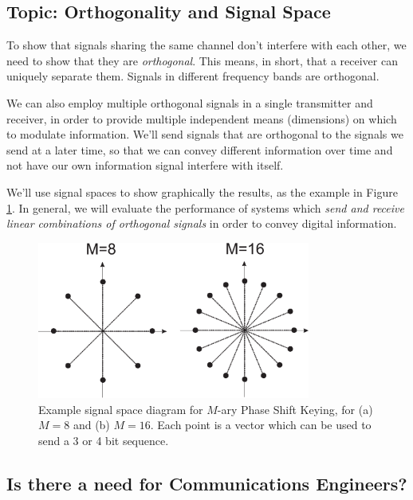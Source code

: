 \subsection{Topic:  Orthogonality and Signal Space}

To show that signals sharing the same channel don't interfere with
each other, we need to show that they are \emph{orthogonal}.  This
means, in short, that a receiver can uniquely separate them. Signals
in different frequency bands are orthogonal.

We can also employ multiple orthogonal signals in a single
transmitter and receiver, in order to provide multiple independent
means (dimensions) on which to modulate information.  We'll send signals that are orthogonal to the signals we send at a later time, so that we can convey different information over time and not have our own information signal interfere with itself.

We'll use signal spaces to show graphically the
results, as the example in Figure \ref{F:MPSK-signalSpaceDiagram}.  In general, we will evaluate the performance of systems which \emph{send and receive linear combinations of orthogonal signals} in order to convey digital information.

\begin{figure}[htbp]
  \centerline{
  \includegraphics[width=0.8\textwidth]
  {../images/MPSK-signalSpaceDiagram.eps}
  }
  \caption{Example signal space diagram for $M$-ary Phase Shift Keying, for (a) $M=8$ and (b) $M=16$.
           Each point is a vector which can be used to send a 3 or 4 bit sequence.}
  \label{F:MPSK-signalSpaceDiagram}
\end{figure}

\subsection{Is there a need for Communications Engineers?}

